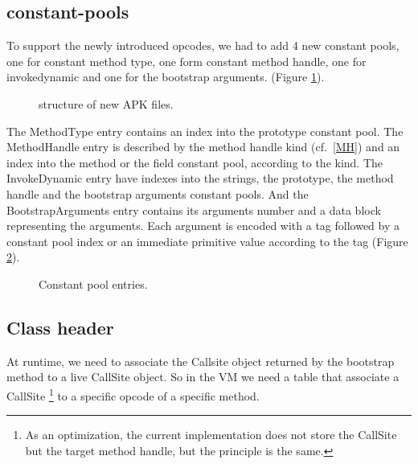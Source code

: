 \documentclass{sig-alternate}
\begin{document}
  \subsection{constant-pools}
    \label{CP}

    To support the newly introduced opcodes, we had to add 4 new constant pools,
    one for constant method type, one form constant method handle, one for invokedynamic
    and one for the bootstrap arguments. (Figure \ref{SNA}).

    \begin{figure}[!h]
      \centering \resizebox{.45\linewidth}{!}{}
      \caption{structure of new APK files.}
      \label{SNA}
    \end{figure}

    The MethodType entry contains an index into the prototype constant pool.
    The MethodHandle entry is described by the method handle kind (cf.~\ref{MH})
    and an index into the method or the field constant pool, according to the kind.
    The InvokeDynamic entry have indexes into the strings, the prototype,
    the method handle and the bootstrap arguments constant pools.
    And the BootstrapArguments entry contains its arguments number
    and a data block representing the arguments.
    Each argument is encoded with a tag followed by a constant pool index or
    an immediate primitive value according to the tag (Figure \ref{CPentries}).

    \begin{figure}[!h]
      \centering 
      \centering 
      \centering 
      \centering \vspace{-1.5em}
      \caption{Constant pool entries.}
      \label{CPentries}
    \end{figure}

  \subsection{Class header}

    At runtime, we need to associate the Callsite object returned by the bootstrap method
    to a live CallSite object. So in the VM we need a table that associate a CallSite
    \footnote{As an optimization, the current implementation does not store the CallSite
     but the target method handle, but the principle is the same.}
    to a specific opcode of a specific method.
\end{document}
